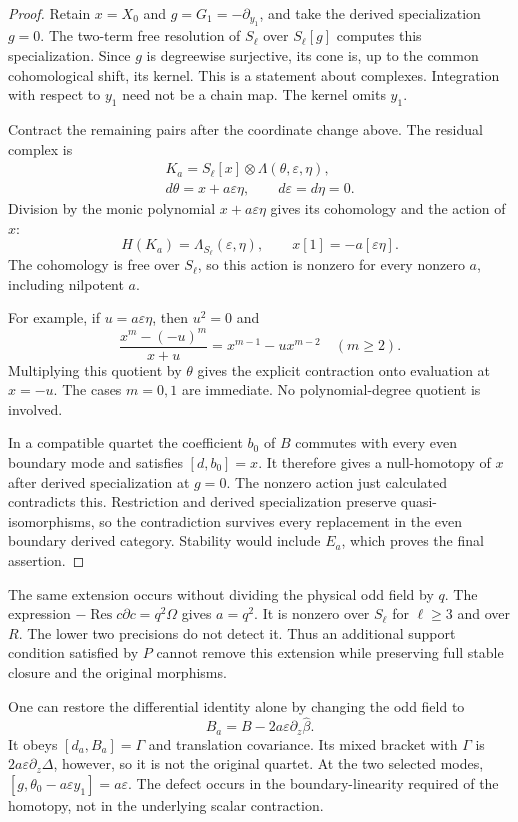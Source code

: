 \begin{proof}
Retain $x=X_0$ and $g=G_1=-\partial_{y_1}$, and take the
derived specialization $g=0$. The two-term free resolution
of $S_\ell$ over $S_\ell[g]$ computes this specialization.
Since $g$ is degreewise surjective, its cone is, up to the
common cohomological shift, its kernel. This is a statement
about complexes. Integration with respect to $y_1$ need
not be a chain map. The kernel omits $y_1$.

Contract the remaining pairs after the coordinate change
above. The residual complex is
\begin{gather*}
 K_a=S_\ell[x]\otimes\Lambda(\theta,\varepsilon,\eta),\\
 d\theta=x+a\varepsilon\eta,\qquad d\varepsilon=d\eta=0.
\end{gather*}
Division by the monic polynomial $x+a\varepsilon\eta$
gives its cohomology and the action of $x$:
\[
 H(K_a)=\Lambda_{S_\ell}(\varepsilon,\eta),\qquad
 x[1]=-a[\varepsilon\eta].
\]
The cohomology is free over $S_\ell$, so this action is
nonzero for every nonzero $a$, including nilpotent $a$.

For example, if $u=a\varepsilon\eta$, then $u^2=0$ and
\[
 \frac{x^m-(-u)^m}{x+u}=x^{m-1}-ux^{m-2}\quad(m\geq2).
\]
Multiplying this quotient by $\theta$ gives the explicit
contraction onto evaluation at $x=-u$. The cases $m=0,1$
are immediate. No polynomial-degree quotient is involved.

In a compatible quartet the coefficient $b_0$ of $B$
commutes with every even boundary mode and satisfies
$[d,b_0]=x$. It therefore gives a null-homotopy of $x$
after derived specialization at $g=0$. The nonzero action
just calculated contradicts this. Restriction and derived
specialization preserve quasi-isomorphisms, so the
contradiction survives every replacement in the even
boundary derived category. Stability would include $E_a$,
which proves the final assertion.
\end{proof}

The same extension occurs without dividing the physical
odd field by $q$. The expression
$-\operatorname{Res}c\partial c=q^2\Omega$ gives $a=q^2$.
It is nonzero over $S_\ell$ for $\ell\geq3$ and over $R$.
The lower two precisions do not detect it. Thus an
additional support condition satisfied by $P$ cannot
remove this extension while preserving full stable
closure and the original morphisms.

One can restore the differential identity alone by changing
the odd field to
\[
 B_a=B-2a\varepsilon\partial_z\widehat\beta.
\]
It obeys $[d_a,B_a]=\Gamma$ and translation covariance.
Its mixed bracket with $\Gamma$ is
$2a\varepsilon\partial_z\Delta$, however, so it is not
the original quartet. At the two selected modes,
$[g,\theta_0-a\varepsilon y_1]=a\varepsilon$.
The defect occurs in the boundary-linearity required
of the homotopy, not in the underlying scalar contraction.

